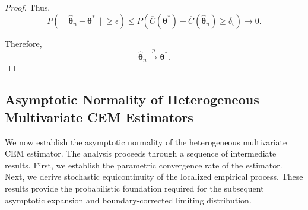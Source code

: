 \documentclass[pdflatex,sn-mathphys-ay]{sn-jnl}%
\let\oldtheta\theta
\renewcommand{\theta}{\boldsymbol{\oldtheta}}
\theoremstyle{thmstyleone}%
\theoremstyle{thmstyletwo}%
\theoremstyle{thmstylethree}%
\begin{document}
\begin{proof}
Thus,
\[
    P
    \left(
        \|\widehat{\boldsymbol{\theta}}_n
        -
        \boldsymbol{\theta}^*\|
        \geq
        \epsilon
    \right)
    \leq
    P
    \left(
        \overline{C}(\boldsymbol{\theta}^*)
        -
        \overline{C}(\widehat{\boldsymbol{\theta}}_n)
        \geq
        \delta_\epsilon
    \right)
    \to
    0.
\]

Therefore,
\[
    \widehat{\boldsymbol{\theta}}_n
    \xrightarrow{p}
    \boldsymbol{\theta}^*.
\]

\end{proof}


\subsection{Asymptotic Normality of Heterogeneous Multivariate CEM Estimators}
\label{subsec:asymptotic_normality}

We now establish the asymptotic normality of the heterogeneous multivariate CEM estimator. The analysis proceeds through a sequence of intermediate results. First, we establish the parametric convergence rate of the estimator. Next, we derive stochastic equicontinuity of the localized empirical process. These results provide the probabilistic foundation required for the subsequent asymptotic expansion and boundary-corrected limiting distribution.
\end{document}
